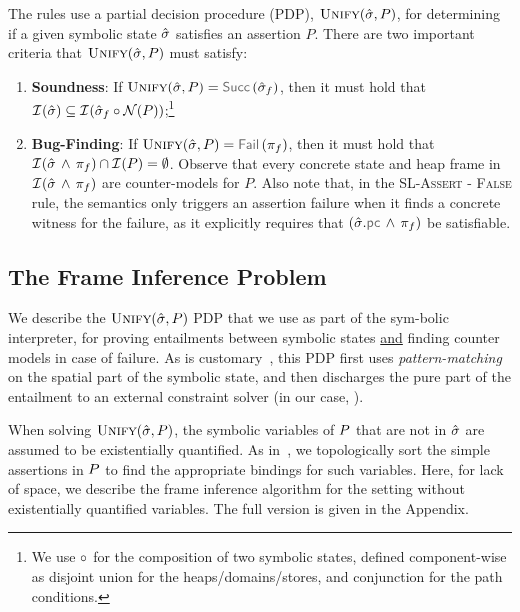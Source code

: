\vspace*{-0.2cm}
\noindent The rules use a partial decision procedure (PDP), $\textsc{Unify}(\hat{\sigma}, P)$, for 
determining if a given symbolic state $\hat{\sigma}$ satisfies an assertion $P$. 
There are two important criteria that $\textsc{Unify}(\hat{\sigma}, P)$ must satisfy:
\begin{enumerate}[leftmargin=*]
\setlength{\itemsep}{0.1cm}
%
\item {\bfseries Soundness}: If $\unificationfun(\sstate, \pass) = \success{\sstate_f}$, then it must hold that $\mathcal{I}^{}_{}(\hat{\sigma}) \subseteq \mathcal{I}^{}_{}(\hat{\sigma}_f \circ \mathcal{N}(P))$;\footnote{We use $\circ$ for the composition of two symbolic states, defined component-wise as disjoint union for the  heaps/domains/stores, and conjunction for the path conditions.}
%
\item {\bfseries Bug-Finding}: If $\unificationfun(\sstate, \pass) = \fail{\pc_f}$, then it must hold that $\mathcal{I}^{}_{}(\hat{\sigma} \, \wedge \, \pi_f) \cap \mathcal{I}^{}_{}(P) = \emptyset$. Observe that every concrete state and heap frame in $\mathcal{I}^{}_{}(\hat{\sigma} \, \wedge \, \pi_f)$ are counter-models for $P$. 
Also note that, in the \textsc{SL-Assert - False} rule, the semantics only triggers an assertion failure when it finds a concrete witness for the failure, 
as it explicitly requires that $(\sstate.\pcsel \wedge \, \pc_f)$ be satisfiable.
\end{enumerate}



\subsection{The Frame Inference Problem}\label{subsec:fip}

We describe the $\textsc{Unify}(\hat{\sigma}, P)$ PDP that we
use as part of the \jsil sym-bolic interpreter, for proving entailments 
between symbolic states \underline{and} finding counter 
models in case of failure.  
As is customary~\cite{javert,jacobs2011verifast,sepwithsmt}, this PDP first uses \emph{pattern-matching} 
on the spatial part of the symbolic state, and then discharges the pure part of the 
entailment to an external constraint solver (in our case, \rosette). 



When solving $\textsc{Unify}(\hat{\sigma}, P)$, the symbolic variables of $P$ that are not 
in $\hat{\sigma}$ are assumed to be existentially quantified. 
As in~\cite{nguyen:vmcai:2008}, we 
topologically sort the simple assertions in $P$ to find the appropriate bindings 
for such variables. Here, for lack of space, we describe the frame inference 
algorithm for the setting without existentially quantified variables. 
The full version is given in the Appendix.  

